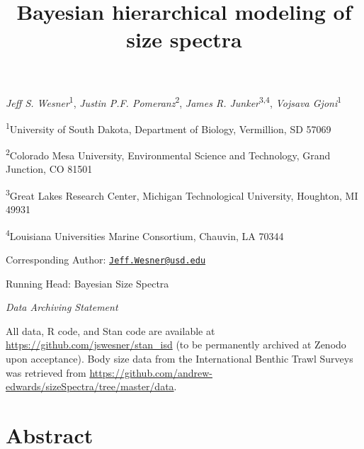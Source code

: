 \documentclass[
  12pt,
]{article}
\title{Bayesian hierarchical modeling of size spectra}
\author{}
\date{\vspace{-2.5em}}
\begin{document}
\maketitle

\emph{Jeff S. Wesner}\textsuperscript{1}, \emph{Justin P.F.
Pomeranz}\textsuperscript{2}, \emph{James R.
Junker}\textsuperscript{3,4}, \emph{Vojsava Gjoni}\textsuperscript{1}

\textsuperscript{1}University of South Dakota, Department of Biology,
Vermillion, SD 57069

\textsuperscript{2}Colorado Mesa University, Environmental Science and
Technology, Grand Junction, CO 81501

\textsuperscript{3}Great Lakes Research Center, Michigan Technological
University, Houghton, MI 49931

\textsuperscript{4}Louisiana Universities Marine Consortium, Chauvin, LA
70344

Corresponding Author:
\href{mailto:Jeff.Wesner@usd.edu}{\nolinkurl{Jeff.Wesner@usd.edu}}

Running Head: Bayesian Size Spectra

\emph{Data Archiving Statement}

All data, R code, and Stan code are available at
\url{https://github.com/jswesner/stan_isd} (to be permanently archived
at Zenodo upon acceptance). Body size data from the International
Benthic Trawl Surveys was retrieved from
\url{https://github.com/andrew-edwards/sizeSpectra/tree/master/data}.

\newpage

\hypertarget{abstract}{%
\section{Abstract}\label{abstract}}
\end{document}

